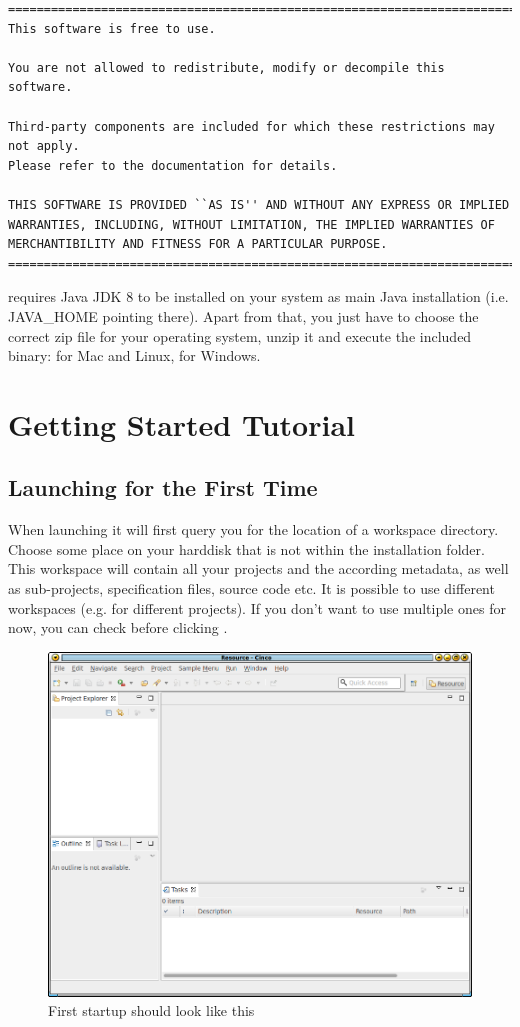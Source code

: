 \documentclass[a4paper,american,12pt]{scrreprt}
\begin{document}
\begin{verbatim}
===============================================================================
This software is free to use.

You are not allowed to redistribute, modify or decompile this software.

Third-party components are included for which these restrictions may not apply.
Please refer to the documentation for details.

THIS SOFTWARE IS PROVIDED ``AS IS'' AND WITHOUT ANY EXPRESS OR IMPLIED
WARRANTIES, INCLUDING, WITHOUT LIMITATION, THE IMPLIED WARRANTIES OF
MERCHANTIBILITY AND FITNESS FOR A PARTICULAR PURPOSE.
===============================================================================
\end{verbatim}

\cinco{} requires Java JDK 8 to be installed on your system as main Java
installation (i.e. JAVA\_HOME pointing there). Apart from that, you just have
to choose the correct zip file for your operating system, unzip it and execute
the included binary:  for Mac and Linux,  for
Windows.

\section{Getting Started Tutorial}

\subsection{Launching \cinco for the First Time}
\label{sec:firstLaunch}

When launching \cinco{} it will first query you for the location of a workspace
directory. Choose some place on your harddisk that is not within the \cinco
installation folder. This workspace will contain all your \cinco projects
and the according metadata, as well as sub-projects, specification files, source
code etc. It is possible to use different workspaces (e.g. for different
projects). If you don't want to use multiple ones for now, you can check
 before clicking .

\begin{figure}
	\centering
	\includegraphics[width=.7\textwidth]{screenshots/cinco-gui-firststart.png} 
	\caption{First startup should look like this}
	\label{fig:firstStart}
\end{figure}
\end{document}
